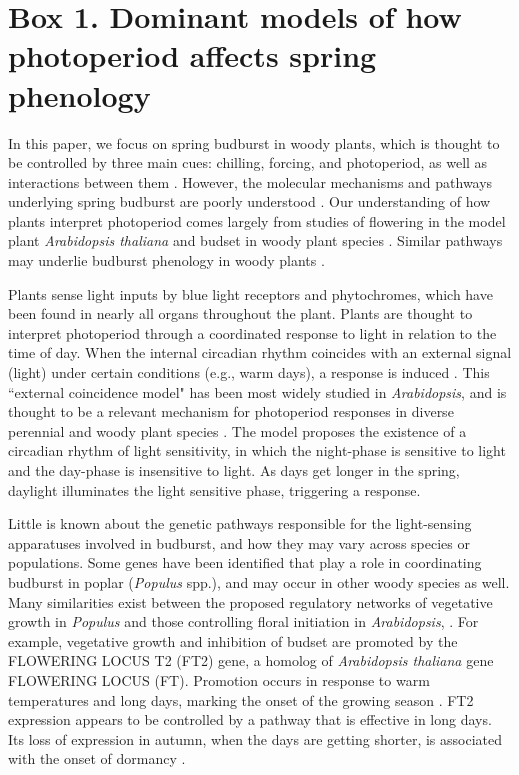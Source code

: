 \documentclass{article}
\begin{document}
\section*{Box 1. Dominant models of how photoperiod affects spring phenology}
\par In this paper, we focus on spring budburst in woody plants, which is thought to be controlled by three main cues: chilling, forcing, and photoperiod, as well as interactions between them \citep{flynn2018,Heide:2008aa, zohner2016}. However, the molecular mechanisms and pathways underlying spring budburst are poorly understood \citep{ding2016}. Our understanding of how plants interpret photoperiod comes largely from studies of flowering in the model plant \emph{Arabidopsis thaliana} \citep[e.g.,][]{suarez2001} and budset in woody plant species \citep[e.g., ][]{Howe:1996}. Similar pathways may underlie budburst phenology in woody plants \citep{lagercrantz2009,ding2016}.
\par Plants sense light inputs by blue light receptors and phytochromes, which have been found in nearly all organs throughout the plant. Plants are thought to interpret photoperiod through a coordinated response to light in relation to the time of day. When the internal circadian rhythm coincides with an external signal (light) under certain conditions (e.g., warm days), a response is induced \citep{lagercrantz2009}. This ``external coincidence model" has been most widely studied in \emph{Arabidopsis}, and is thought to be a relevant mechanism for photoperiod responses in diverse perennial and woody plant species \citep{davis2002,petterle2013,bastow2002,kobayashi2007,andres2012,Singh:2017}. %
The model proposes the existence of a circadian rhythm of light sensitivity, in which the night-phase is sensitive to light and the day-phase is insensitive to light. As days get longer in the spring, daylight illuminates the  light sensitive phase, triggering a response. %
\par Little is known about the genetic pathways responsible for the light-sensing apparatuses involved in budburst, and how they may vary across species or populations. Some genes have been identified that play a role in coordinating budburst in poplar (\emph{Populus} spp.), and may occur in other woody species as well. Many similarities exist between the proposed regulatory networks of vegetative growth in \emph{Populus} and those controlling floral initiation in \emph{Arabidopsis}, \citet{ding2016}. For example, vegetative growth and inhibition of budset are promoted by the FLOWERING LOCUS T2 (FT2) gene, a homolog of \emph{Arabidopsis thaliana} gene FLOWERING LOCUS (FT). Promotion occurs in response to warm temperatures and long days, marking the onset of the growing season \citep{hsu2011}. FT2 expression appears to be controlled by a pathway that is effective in long days. Its loss of expression in autumn, when the days are getting shorter, is associated with the onset of dormancy \citep{glover2014}.
\end{document}
